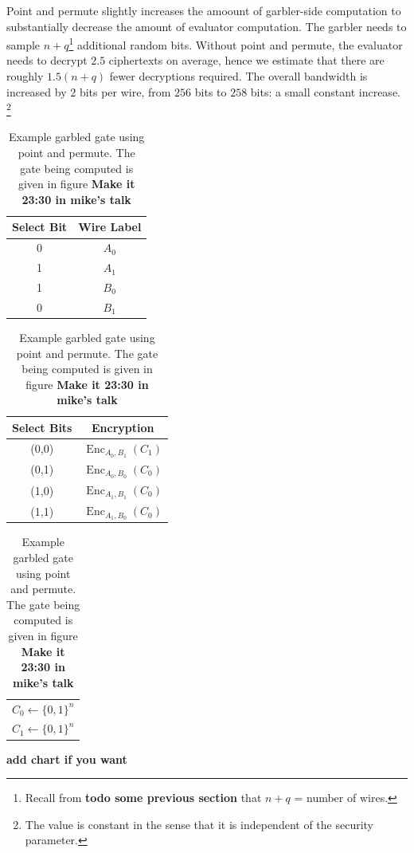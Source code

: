 \documentclass[12pt,twoside]{reedthesis}
\newcommand{\Enc}{\operatorname{Enc}}
\begin{document}
Point and permute slightly increases the amoount of garbler-side computation to substantially decrease the amount of evaluator computation.
The garbler needs to sample $n+q$\footnote{Recall from \textbf{todo some previous section} that $n+q$ = number of wires.} additional random bits.
Without point and permute, the evaluator needs to decrypt $2.5$ ciphertexts on average, hence we estimate that there are roughly $1.5(n+q)$ fewer decryptions required.
The overall bandwidth is increased by $2$ bits per wire, from $256$ bits to $258$ bits: a small constant increase. \footnote{The value is constant in the sense that it is independent of the security parameter.}

\begin{table}[h]
    \centering
    \begin{tabular}{|c|c|}
    \hline
    Select Bit & Wire Label \\
    \hline
    0 & $A_0$ \\
    1 & $A_1$ \\
    1 & $B_0$ \\
    0 & $B_1$ \\
    \hline
    \end{tabular}
    \qquad
    \begin{tabular}{|c|c|}
    \hline
    Select Bits & Encryption \\
    \hline
    (0,0) & $\Enc_{A_0, B_1}(C_1)$ \\
    (0,1) & $\Enc_{A_0, B_0}(C_0)$ \\
    (1,0) & $\Enc_{A_1, B_1}(C_0)$ \\
    (1,1) & $\Enc_{A_1, B_0}(C_0)$ \\
    \hline
    \end{tabular}
    \qquad
    \begin{tabular}{|c|}
    \hline
    $C_0 \gets \{0,1\}^n$ \\
    $C_1 \gets \{0,1\}^n$ \\
    \hline
    \end{tabular}
    \caption{Garbled Gate for Point and Permute}
    \caption{Example garbled gate using point and permute. The gate being computed is given in figure \textbf{Make it 23:30 in mike's talk}}
\end{table}

\textbf{add chart if you want}
\end{document}
